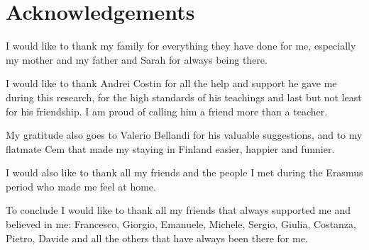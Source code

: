 \chapter*{Acknowledgements}

I would like to thank my family for everything they have done for me, especially my mother and my father and Sarah for always being there.

\bigskip
\noindent I would like to thank Andrei Costin for all the help and support he gave me during this research, for the high standards of his teachings and last but not least for his friendship. I am proud of calling him a friend more than a teacher.

\bigskip
\noindent My gratitude also goes to Valerio Bellandi for his valuable suggestions, and to my flatmate Cem that made my staying in Finland easier, happier and funnier.

\bigskip
\noindent I would also like to thank all my friends and the people I met during the Erasmus period who made me feel at home.

\bigskip
\noindent To conclude I would like to thank all my friends that always supported me and believed in me: Francesco, Giorgio, Emanuele, Michele, Sergio, Giulia, Costanza, Pietro, Davide and all the others that have always been there for me.
\paragraph{}
